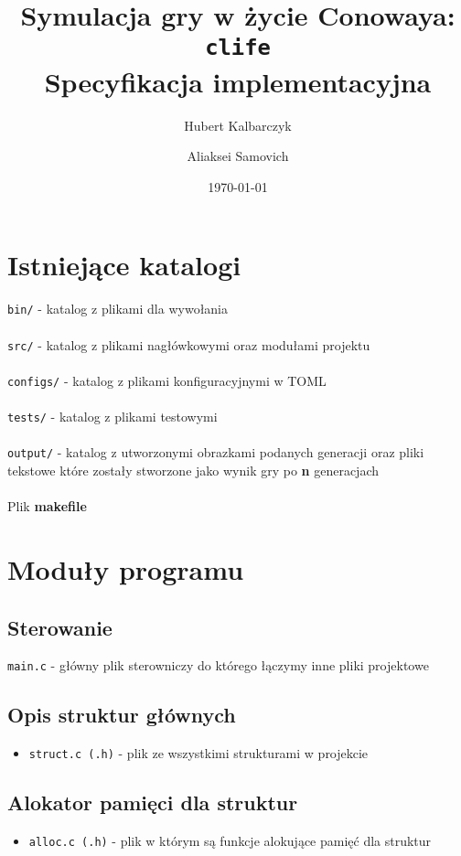 \documentclass[12pt]{article}
\title{Symulacja gry w życie Conowaya: \texttt{clife}\\
Specyfikacja implementacyjna}
\author{
	Hubert Kalbarczyk\\
	\and
	Aliaksei Samovich\\
}
\date{\today}
\begin{document}
\maketitle
\section{Istniejące katalogi}
\texttt{bin/} - katalog z plikami dla wywołania\\\\
\texttt{src/} - katalog z plikami nagłówkowymi oraz modułami projektu\\\\
\texttt{configs/} - katalog z plikami konfiguracyjnymi w TOML\\\\
\texttt{tests/} - katalog z plikami testowymi\\\\
\texttt{output/} - katalog z utworzonymi obrazkami podanych generacji oraz pliki tekstowe które zostały stworzone jako wynik gry po \textbf{n} generacjach\\\\

Plik \textbf{makefile}

\section{Moduły programu}
\subsection{Sterowanie}
 \texttt{main.c} - główny plik sterowniczy do którego łączymy inne pliki projektowe 

\subsection{Opis struktur głównych}
\begin{itemize}
    \item \texttt{struct.c (.h)} - plik ze wszystkimi strukturami w projekcie
\end{itemize}

\subsection{Alokator pamięci dla struktur}
\begin{itemize}
    \item \texttt{alloc.c (.h)} - plik w którym są funkcje alokujące pamięć dla struktur
\end{itemize}
    
\end{document}

